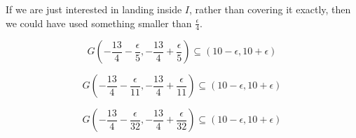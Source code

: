 \documentclass{ximera}
\begin{document}
\begin{example}
If we are just interested in landing inside $I$, rather than covering it exactly, then we could have used something smaller than $\frac{\epsilon}{4}$.



\[    
G\left( -\frac{13}{4} - \frac{\epsilon}{5}, -\frac{13}{4} + \frac{\epsilon}{5} \right) \subseteq (10-\epsilon, 10+\epsilon)
\]


\[    
G\left( -\frac{13}{4} - \frac{\epsilon}{11}, -\frac{13}{4} + \frac{\epsilon}{11} \right) \subseteq (10-\epsilon, 10+\epsilon)
\]

\[    
G\left( -\frac{13}{4} - \frac{\epsilon}{32}, -\frac{13}{4} + \frac{\epsilon}{32} \right) \subseteq (10-\epsilon, 10+\epsilon)
\]












\end{example}
\end{document}
